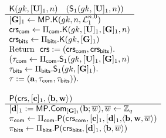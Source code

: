 \begin{figure}
\begin{\algSize}
$$
\begin{array}{l}
\begin{array}{l}
\algK(\gk,[\matr{U}]_1,n)\quad (\mathsf{S}_1(\gk,[\matr{U}]_1,n))\\
\hline
{[{\matr{G}}]_1 \gets \MP.\algK(gk,n,\distlin_1^{n,0})}\\
\crs_\sfcom\gets\Pi_\sfcom.\algK(\gk,[\matr{U}]_1,[\matr{G}]_1, n)\\
\crs_\sfbits\gets\Pi_\sfbits.\algK(\gk,[{\matr{G}}]_1)\\
\text{Return } \ \mathsf{crs}:=(\crs_\sfcom,\crs_\sfbits).\\
(\tau_\sfcom\gets\Pi_\sfcom.\mathsf{S}_1(\gk,[\matr{U}]_1,[\matr{G}]_1,n)\\
\tau_\sfbits\gets\Pi_\sfbits.\mathsf{S}_1(\gk,[{\matr{G}}]_1).\\
\tau := (\vecb{a},\tau_\sfcom,\tau_\sfbits)).\\
\\
\end{array}
\\
\begin{array}{l}
{\algP(\mathsf{crs}, [\vecb{c}]_1, \langle \vecb{b}, \vecb{w}\rangle)}\\
\hline
{[\vecb{d}]_1 :=\MP.\Com_{[\matr{G}]_1}(\vecb{b};\overline{w})},\overline{w}\gets\Z_q\\
{\pi_\sfcom \gets \Pi_{\sfcom}.\algP(\crs_\sfcom,[\vecb{c}]_1,[\vecb{d}]_1,}{\langle\vecb{b},\vecb{w},\overline{w}\rangle)}\\
\pi_\sfbits \gets \Pi_\sfbits.\algP(\crs_\sfbits,[\vecb{d}]_1,\langle \vecb{b},\overline{w}\rangle)\\

\end{array}
\end{array}$$
\end{\algSize}
\end{figure}
